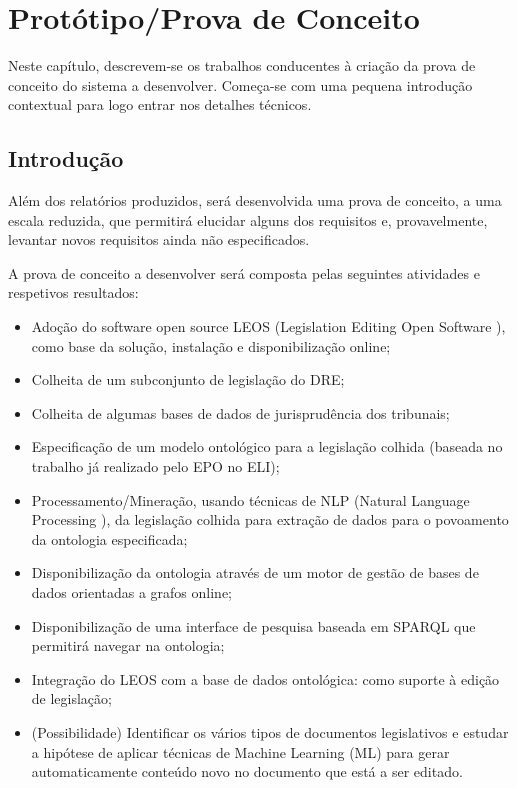 \chapter{Protótipo/Prova de Conceito}
\label{prototipo}

Neste capítulo, descrevem-se os trabalhos conducentes à criação da prova de conceito do sistema a desenvolver. 
Começa-se com uma pequena introdução contextual para logo entrar nos detalhes técnicos.

\section{Introdução}

Além dos relatórios produzidos, será desenvolvida uma prova de conceito, a uma escala
reduzida, que permitirá elucidar alguns dos requisitos e, provavelmente, levantar novos requisitos ainda
não especificados.

A prova de conceito a desenvolver será composta pelas seguintes atividades e respetivos
resultados:

\begin{itemize}
\item Adoção do software open source LEOS (Legislation Editing Open Software ), como base da
solução, instalação e disponibilização online;
\item Colheita de um subconjunto de legislação do DRE;
\item Colheita de algumas bases de dados de jurisprudência dos tribunais;
\item Especificação de um modelo ontológico para a legislação colhida (baseada no trabalho já
realizado pelo EPO no ELI);
\item Processamento/Mineração, usando técnicas de NLP (Natural Language Processing ), da
legislação colhida para extração de dados para o povoamento da ontologia especificada;
\item Disponibilização da ontologia através de um motor de gestão de bases de dados orientadas a
grafos online;
\item Disponibilização de uma interface de pesquisa baseada em SPARQL que permitirá navegar na
ontologia;
\item Integração do LEOS com a base de dados ontológica: como suporte à edição de legislação;
\item  (Possibilidade) Identificar os vários tipos de documentos legislativos e estudar a hipótese de
aplicar técnicas de Machine Learning (ML) para gerar automaticamente conteúdo novo no
documento que está a ser editado.
\end{itemize}

